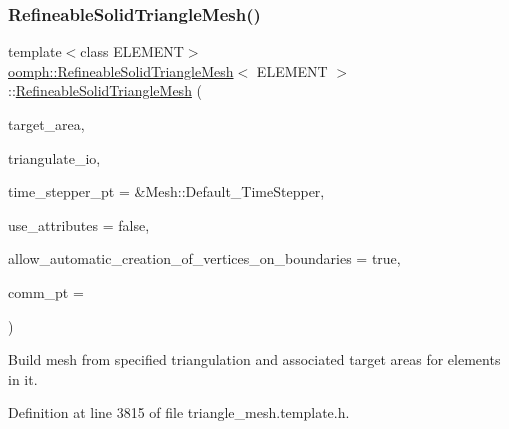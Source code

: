 \subsubsection{\texorpdfstring{Refineable\+Solid\+Triangle\+Mesh()}{RefineableSolidTriangleMesh()}\hspace{0.1cm}{\footnotesize\ttfamily [2/2]}}
{\footnotesize\ttfamily template$<$class E\+L\+E\+M\+E\+NT$>$ \\
\hyperlink{classoomph_1_1RefineableSolidTriangleMesh}{oomph\+::\+Refineable\+Solid\+Triangle\+Mesh}$<$ E\+L\+E\+M\+E\+NT $>$\+::\hyperlink{classoomph_1_1RefineableSolidTriangleMesh}{Refineable\+Solid\+Triangle\+Mesh} (\begin{DoxyParamCaption}\item[{const Vector$<$ double $>$ \&}]{target\+\_\+area,  }\item[{Triangulate\+IO \&}]{triangulate\+\_\+io,  }\item[{Time\+Stepper $\ast$}]{time\+\_\+stepper\+\_\+pt = {\ttfamily \&Mesh\+:\+:Default\+\_\+TimeStepper},  }\item[{const bool \&}]{use\+\_\+attributes = {\ttfamily false},  }\item[{const bool \&}]{allow\+\_\+automatic\+\_\+creation\+\_\+of\+\_\+vertices\+\_\+on\+\_\+boundaries = {\ttfamily true},  }\item[{Oomph\+Communicator $\ast$}]{comm\+\_\+pt = {} }\end{DoxyParamCaption})\hspace{0.3cm}{\ttfamily [inline]}}



Build mesh from specified triangulation and associated target areas for elements in it. 



Definition at line 3815 of file triangle\+\_\+mesh.\+template.\+h.

\mbox{\label{classoomph_1_1RefineableSolidTriangleMesh_a8b4ea32b78a6f80536dba20538452e7b}} 
